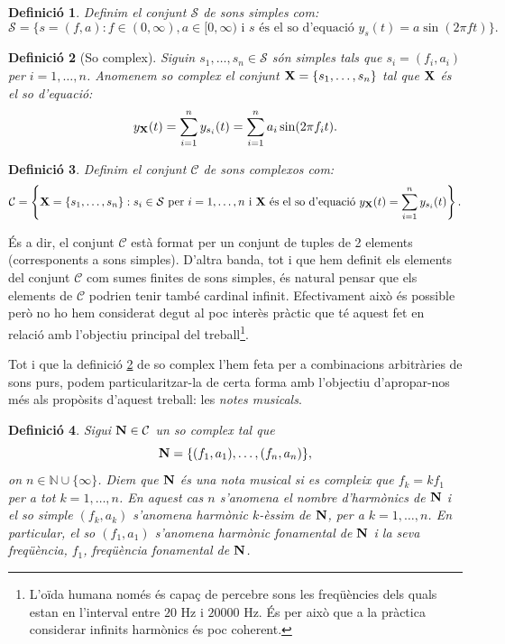 \documentclass{article}
\theoremstyle{math}
\newtheorem{definition}{Definició}[section]
\theoremstyle{TheoremNum}
\newcommand{\0}{\ensuremath{\vb{0}}}
\newcommand{\N}{\ensuremath{\vb{N}}}
\newcommand{\X}{\ensuremath{\vb{X}}}
\newcommand{\NN}{\ensuremath{\mathbb{N}}} %
\newcommand\Hz{\text{ Hz}}
\begin{document}
\begin{definition}
    Definim el conjunt $\mathcal{S}$ de sons simples com: $$\mathcal{S}=\{s=(f,a):f\in(0,\infty),a\in[0,\infty)\text{ i $s$ és el so d'equació }y_s(t)=a\sin(2\pi ft)\}.$$
\end{definition}
\begin{definition}[So complex]\label{so_complex}
Siguin $s_1,\ldots,s_n\in\mathcal{S}$ són simples tals que $s_i=(f_i,a_i)$ per $i=1,\ldots,n$. Anomenem \textit{so complex} el conjunt $\X=\{s_1,\ldots,s_n\}$ tal que $\X$ és el so d'equació: $$y_{\X}(t)=\sum_{i=1}^ny_{s_i}(t)=\sum_{i=1}^na_i\sin(2\pi f_it).$$
\end{definition}
\begin{definition}
    Definim el conjunt $\mathcal{C}$ de sons complexos com:
    $$\mathcal{C}=\left\{\X=\{s_1,\ldots,s_n\}:s_i\in\mathcal{S}\text{ per } i=1,\ldots,n\text{ i $\X$ és el so d'equació }y_{\X}(t)=\sum_{i=1}^ny_{s_i}(t)\right\}.$$
\end{definition}
\noindent És a dir, el conjunt $\mathcal{C}$ està format per un conjunt de tuples de 2 elements (corresponents a sons simples). D'altra banda, tot i que hem definit els elements del conjunt $\mathcal{C}$ com sumes finites de sons simples, és natural pensar que els elements de $\mathcal{C}$ podrien tenir també cardinal infinit. Efectivament això és possible però no ho hem considerat degut al poc interès pràctic que té aquest fet en relació amb l'objectiu principal del treball\footnote{L'oïda humana només és capaç de percebre sons les freqüències dels quals estan en l'interval entre $20\Hz$ i $20000\Hz$. És per això que a la pràctica considerar infinits harmònics és poc coherent.}.\par
Tot i que la definició \ref{so_complex} de so complex l'hem feta per a combinacions arbitràries de sons purs, podem  particularitzar-la de certa forma amb l'objectiu d'apropar-nos més als propòsits d'aquest treball: les \textit{notes musicals}.
\begin{definition}
    Sigui $\N\in\mathcal{C}$ un so complex tal que $$\N=\{(f_1,a_1),\ldots,(f_n,a_n)\},$$ on $n\in\NN\cup\{\infty\}$. Diem que $\N$ és una \textit{nota musical} si es compleix que $f_k=kf_1$ per a tot $k=1,\ldots,n$. En aquest cas $n$ s'anomena el \textit{nombre d'harmònics de $\N$} i el so simple $(f_k,a_k)$ s'anomena \textit{harmònic $k$-èssim de $\N$}, per a $k=1,\ldots,n$. En particular, el so $(f_1,a_1)$ s'anomena \textit{harmònic fonamental de $\N$} i la seva freqüència, $f_1$, \textit{freqüència fonamental de $\N$}.
\end{definition}
\end{document}
